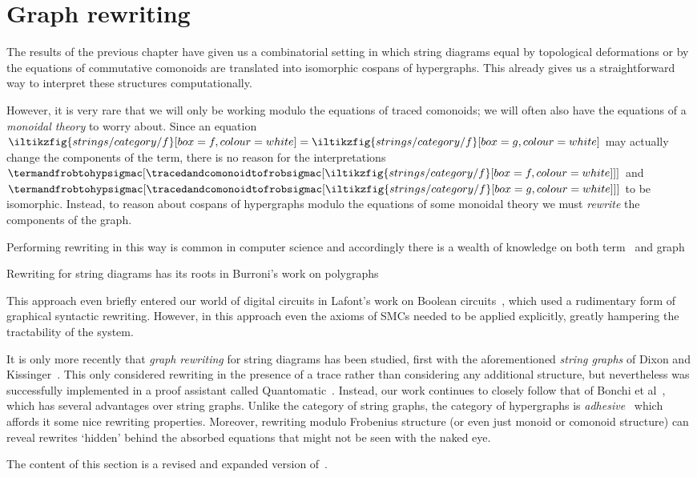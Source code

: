 \chapter{Graph rewriting}

The results of the previous chapter have given us a combinatorial setting in
which string diagrams equal by topological deformations or by the equations of
commutative comonoids are translated into isomorphic cospans of hypergraphs.
This already gives us a straightforward way to interpret these structures
computationally.

However, it is very rare that we will only be working modulo the equations of
traced comonoids; we will often also have the equations of a
\emph{monoidal theory} to worry about.
Since an equation \(
    \iltikzfig{strings/category/f}[box=f,colour=white]
    =
    \iltikzfig{strings/category/f}[box=g,colour=white]
\) may actually change the components of the term, there is no reason for the
interpretations \(
    \termandfrobtohypsigmac[
        \tracedandcomonoidtofrobsigmac[
            \iltikzfig{strings/category/f}[box=f,colour=white]
        ]
    ]
\) and \(
    \termandfrobtohypsigmac[
        \tracedandcomonoidtofrobsigmac[
            \iltikzfig{strings/category/f}[box=g,colour=white]
        ]
    ]
\) to be isomorphic.
Instead, to reason about cospans of hypergraphs modulo the equations of some
monoidal theory we must \emph{rewrite} the components of the graph.

Performing rewriting in this way is common in computer science and accordingly
there is a wealth of knowledge on both
term~\cite{knuth1970simple,gadduchi1996algebraic} and graph~\cite{}

Rewriting for string diagrams has its roots in Burroni's work on
polygraphs~\cite{burroni}

This approach even briefly entered our world of digital circuits in Lafont's
work on Boolean circuits~\cite{lafont2003algebraic}, which used a rudimentary
form of graphical syntactic rewriting.
However, in this approach even the axioms of SMCs needed to be applied
explicitly, greatly hampering the tractability of the system.

It is only more recently that \emph{graph rewriting} for string diagrams has
been studied, first with the aforementioned \emph{string graphs} of Dixon and
Kissinger~\cite{dixon2010open,kissinger2012pictures,dixon2013opengraphs}.
This only considered rewriting in the presence of a trace rather than
considering any additional structure, but nevertheless was successfully
implemented in a proof assistant called
Quantomatic~\cite{kissinger2015quantomatic}.
Instead, our work continues to closely follow that of Bonchi et
al~\cite{bonchi2022string,bonchi2022stringa}, which has several advantages
over string graphs.
Unlike the category of string graphs, the category of hypergraphs is
\emph{adhesive}~\cite{lack2004adhesive} which affords it some nice rewriting
properties.
Moreover, rewriting modulo Frobenius structure (or even just monoid or comonoid
structure) can reveal rewrites `hidden' behind the absorbed equations that might
not be seen with the naked eye.

\begin{remark}
    The content of this section is a revised and expanded version
    of~\cite[Sec. 5]{ghica2023rewriting}.
\end{remark}



